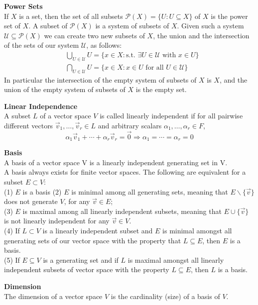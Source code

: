 \documentclass[a4paper, 10pt]{article}
\begin{document}
\begin{multicols*}{3}
\textbf{Power Sets}\\
If $X$ is a set, then the set of all subsets $\mathcal{P}(X)=\{U: U \subseteq X\}$ of $X$ is the power set of $X$. 
A subset of $\mathcal{P}(X)$ is a system of subsets of $X$. 
Given such a system $\mathcal{U} \subseteq \mathcal{P}(X)$ we can create two new subsets of $X$, the union and the intersection of the sets of our system $\mathcal{U}$, as follows:
\begin{align*}
& \bigcup_{U \in \mathcal{U}} U=\{x \in X: \text {s.t. } \exists U \in \mathcal{U} \text { with } x \in U\} \\
& \bigcap_{U \in \mathcal{U}} U=\{x \in X: x \in U \text { for all } U \in \mathcal{U}\}
\end{align*}
In particular the intersection of the empty system of subsets of $X$ is $X$, and the union of the empty system of subsets of $X$ is the empty set.

\textbf{Linear Independence}\\
A subset $L$ of a vector space $V$ is called linearly independent if for all pairwise different vectors $\vec{v}_1, \ldots, \vec{v}_r \in L$ and arbitrary scalars $\alpha_1, \ldots, \alpha_r \in F$,
$$
\alpha_1 \vec{v}_1+\cdots+\alpha_r \vec{v}_r=\overrightarrow{0} \Longrightarrow \alpha_1=\cdots=\alpha_r=0
$$

\textbf{Basis}\\
A basis of a vector space V is a linearly independent generating set in V.\\
A basis always exists for finite vector spaces. 
The following are equivalent for a subset $E\subset V$:\\
(1) $E$ is a basis
(2) $E$ is minimal among all generating sets, meaning that $E \backslash\{\vec{v}\}$ does not generate $V$, for any $\vec{v} \in E$;\\
(3) $E$ is maximal among all linearly independent subsets, meaning that $E \cup\{\vec{v}\}$ is not linearly independent for any $\vec{v} \in V$.\\
(4) If $L \subset V$ is a linearly independent subset and $E$ is minimal amongst all generating sets of our vector space with the property that $L \subseteq E$, then $E$ is a basis.\\
(5) If $E \subseteq V$ is a generating set and if $L$ is maximal amongst all linearly independent subsets of vector space with the property $L \subseteq E$, then $L$ is a basis.

\textbf{Dimension}\\
The dimension of a vector space $V$ is the cardinality (size) of a basis of $V$.


\end{multicols*}
\end{document}
